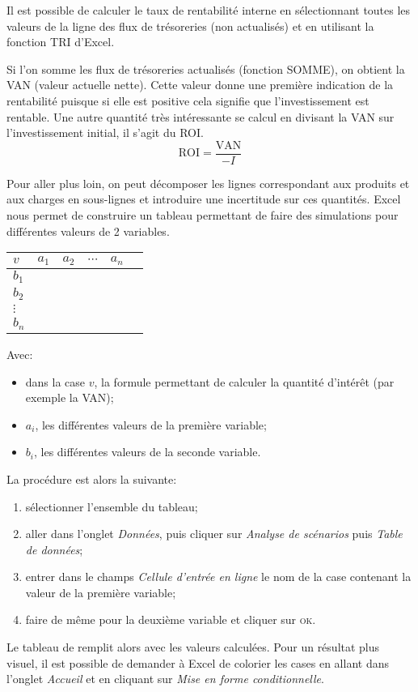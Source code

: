Il est possible de calculer le taux de rentabilité interne en 
sélectionnant toutes les valeurs de la ligne des flux de trésoreries 
(non actualisés) et en utilisant la fonction \textsc{TRI} d'Excel.

Si l'on somme les flux de trésoreries actualisés (fonction \textsc{SOMME}), 
on obtient la VAN (valeur actuelle nette). 
Cette valeur donne une première indication de la rentabilité puisque si elle 
est positive cela signifie que l'investissement est rentable.
Une autre quantité très intéressante se calcul en divisant la VAN 
sur l'investissement initial, il s'agit du ROI.
\[
\text{ROI} = \frac{\text{VAN}}{-I}
\]

Pour aller plus loin, on peut décomposer les lignes correspondant aux produits et 
aux charges en sous-lignes et introduire une incertitude sur ces quantités.
Excel nous permet de construire un tableau permettant de faire des simulations 
pour différentes valeurs de 2 variables.

\begin{center}
\begingroup
\scriptsize
\begin{tabular}{l|ccccc}
  $v$      & $a_1$   & $a_2$  & $\cdots$ & $a_n$ \\
  \hline
  $b_1$    &         &        &          & \\
  $b_2$    &         &        &          &  \\
  $\vdots$ &         &        &          &  \\
  $b_n$    &         &        &          &
\end{tabular}
\endgroup
\end{center}

Avec:
\begin{itemize}
  \item dans la case $v$, la formule permettant de calculer la quantité d'intérêt (par exemple la VAN);
  \item $a_i$, les différentes valeurs de la première variable;
  \item $b_i$, les différentes valeurs de la seconde variable.
\end{itemize}

La procédure est alors la suivante:
\begin{enumerate}
  \item sélectionner l'ensemble du tableau;
  \item aller dans l'onglet \textit{Données}, puis cliquer sur \textit{Analyse de scénarios}
        puis \textit{Table de données};
  \item entrer dans le champs \textit{Cellule d'entrée en ligne} le nom de la case contenant 
        la valeur de la première variable;
  \item faire de même pour la deuxième variable et cliquer sur \textsc{ok}.
\end{enumerate}
Le tableau de remplit alors avec les valeurs calculées. 
Pour un résultat plus visuel, il est possible de demander à Excel de colorier les 
cases en allant dans l'onglet \textit{Accueil} et en cliquant sur \textit{Mise en forme conditionnelle}.